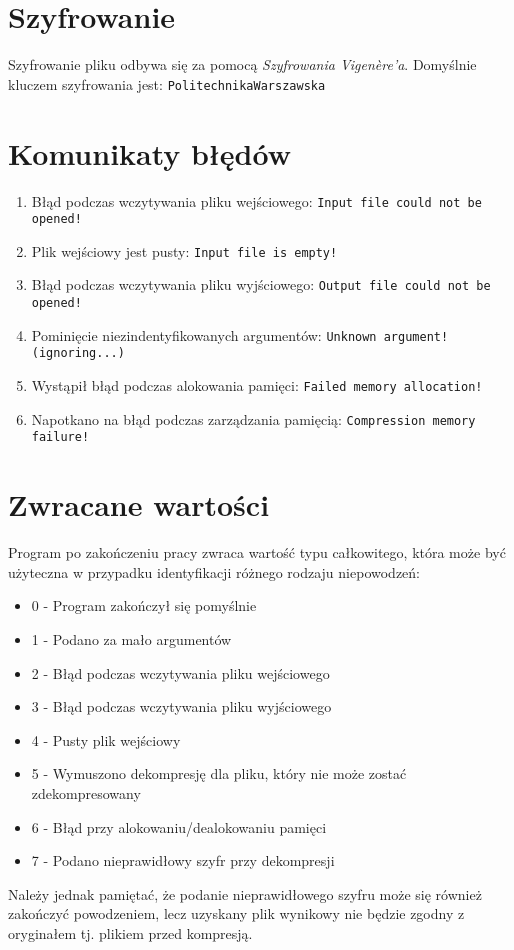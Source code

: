 \documentclass[]{article}
\begin{document}
 \section{Szyfrowanie}\label{header-n281} 
Szyfrowanie pliku odbywa się za pomocą \emph{Szyfrowania Vigenère’a}. Domyślnie kluczem szyfrowania jest: 
\texttt{Politechnika\textunderscore Warszawska}

\section{Komunikaty błędów}\label{header-n281}

\begin{enumerate}
\def\labelenumi{\arabic{enumi}.}
\item
  Błąd podczas wczytywania pliku wejściowego: \texttt{Input file could not be opened!}
\item
Plik wejściowy jest pusty: \texttt{Input file is empty!}
\item
Błąd podczas wczytywania pliku wyjściowego:  \texttt{Output file could not be opened!}
\item
Pominięcie niezindentyfikowanych argumentów: \texttt{Unknown argument! (ignoring...)}
\item
Wystąpił błąd podczas alokowania pamięci: \texttt{Failed memory allocation!}
\item
Napotkano na błąd podczas zarządzania pamięcią: \texttt{Compression memory failure!}

\end{enumerate}

\section{Zwracane wartości}\label{header-n281}

Program po zakończeniu pracy zwraca wartość typu całkowitego, która może być użyteczna w przypadku identyfikacji różnego rodzaju niepowodzeń:

\begin{itemize}
\item
0 - Program zakończył się pomyślnie
\item
1 - Podano za mało argumentów
\item
2 - Błąd podczas wczytywania pliku wejściowego
\item
3 - Błąd podczas wczytywania pliku wyjściowego
\item
4 - Pusty plik wejściowy
\item
5 - Wymuszono dekompresję dla pliku, który nie może zostać zdekompresowany
\item
6 - Błąd przy alokowaniu/dealokowaniu pamięci
\item
7 - Podano nieprawidłowy szyfr przy dekompresji
\end{itemize}
Należy jednak pamiętać, że podanie nieprawidłowego szyfru może się również zakończyć powodzeniem, lecz uzyskany plik wynikowy nie będzie zgodny z oryginałem tj. plikiem przed kompresją.
\end{document}
